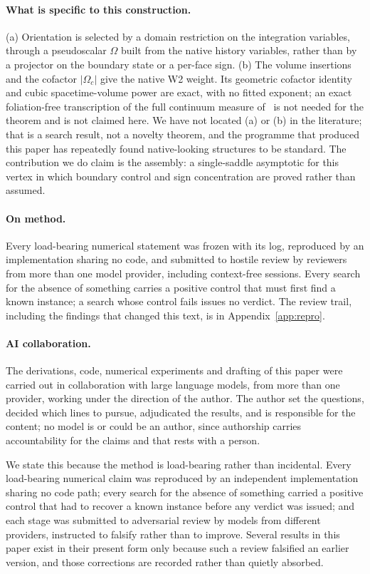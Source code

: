 \documentclass[11pt]{article}
\numberwithin{equation}{section}
\theoremstyle{definition}
\theoremstyle{remark}
\begin{document}
\paragraph{What is specific to this construction.}
(a) Orientation is selected by a domain restriction on the integration variables,
through a pseudoscalar $\Omega$ built from the native history variables, rather
than by a projector on the boundary state or a per-face sign. (b) The volume
insertions and the cofactor $|\Omega_c|$ give the native W2 weight. Its geometric
cofactor identity and cubic spacetime-volume power are exact, with no fitted
exponent; an exact foliation-free transcription of the full continuum measure
of~\cite{ShiraziEngle2014} is not needed for the theorem and is not claimed here. We have not
located (a) or (b) in the literature; that is a search result, not a novelty
theorem, and the programme that produced this paper has repeatedly found
native-looking structures to be standard. The contribution we do claim is the
assembly: a single-saddle asymptotic for this vertex in which boundary control
and sign concentration are proved rather than assumed.

\paragraph{On method.}
Every load-bearing numerical statement was frozen with its log, reproduced by an
implementation sharing no code, and submitted to hostile review by reviewers from
more than one model provider, including context-free sessions. Every search for
the absence of something carries a positive control that must first find a known
instance; a search whose control fails issues no verdict. The review trail,
including the findings that changed this text, is in
Appendix~\ref{app:repro}.

\paragraph{AI collaboration.}
The derivations, code, numerical experiments and drafting of this paper were
carried out in collaboration with large language models, from more than one
provider, working under the direction of the author. The author set the
questions, decided which lines to pursue, adjudicated the results, and is
responsible for the content; no model is or could be an author, since authorship
carries accountability for the claims and that rests with a person.

We state this because the method is load-bearing rather than incidental. Every
load-bearing numerical claim was reproduced by an independent implementation
sharing no code path; every search for the absence of something carried a
positive control that had to recover a known instance before any verdict was
issued; and each stage was submitted to adversarial review by models from
different providers, instructed to falsify rather than to improve. Several
results in this paper exist in their present form only because such a review
falsified an earlier version, and those corrections are recorded rather than
quietly absorbed.
\end{document}
